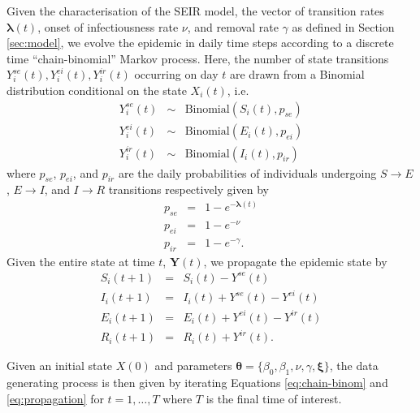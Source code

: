 \documentclass[a4paper]{article}
\begin{document}
\begin{appendices}
Given the characterisation of the SEIR model, the vector of transition rates
$\bm{\lambda}(t)$, onset of infectiousness rate $\nu$,
and removal rate $\gamma$ as defined in Section \ref{sec:model}, we evolve the epidemic in daily time
steps according to a discrete time ``chain-binomial'' Markov process.  Here, the number
of state transitions $Y^{se}_i(t), Y^{ei}_i(t),Y^{ir}_i(t) $ occurring on day $t$ are drawn
from a Binomial distribution conditional on the state $X_i(t)$, i.e.
\begin{eqnarray}\label{eq:chain-binom}
Y^{se}_i(t) & \sim & \mbox{Binomial}(S_i(t), p_{se}) \nonumber \\
Y^{ei}_i(t) & \sim & \mbox{Binomial}(E_i(t), p_{ei}) \nonumber \\
Y^{ir}_i(t) & \sim & \mbox{Binomial}(I_i(t), p_{ir})
\end{eqnarray}
where $p_{se}$, $p_{ei}$, and $p_{ir}$ are the daily probabilities of individuals
undergoing $S\rightarrow E$, $E\rightarrow I$, and $I\rightarrow R$ transitions
respectively given by
\begin{eqnarray*}
  p_{se} & = & 1 - e^{-\bm{\lambda}(t)} \\
  p_{ei} & = & 1 - e^{-\nu} \\
  p_{ir} & = & 1 - e^{-\gamma}.
\end{eqnarray*}
Given the entire state at time $t$, $\bm{Y}(t)$, we propagate the epidemic state by
\begin{eqnarray} \label{eq:propagation}
  S_i(t+1) & = & S_i(t) - Y^{se}(t) \nonumber \\
  I_i(t+1) & = & I_i(t) + Y^{se}(t) - Y^{ei}(t) \nonumber \\
  E_i(t+1) & = & E_i(t) + Y^{ei}(t) - Y^{ir}(t) \nonumber \\
  R_i(t+1) & = & R_i(t) + Y^{ir}(t).
\end{eqnarray}

Given an initial state $X(0)$ and parameters $\bm{\theta}=\{ \beta_0, \beta_1, \nu,
\gamma, \bm{\xi}\}$, the data generating process is then given by iterating Equations
\ref{eq:chain-binom} and \ref{eq:propagation} for $t=1,\dots,T$ where $T$ is the final time of interest.



\end{appendices}
\end{document}
